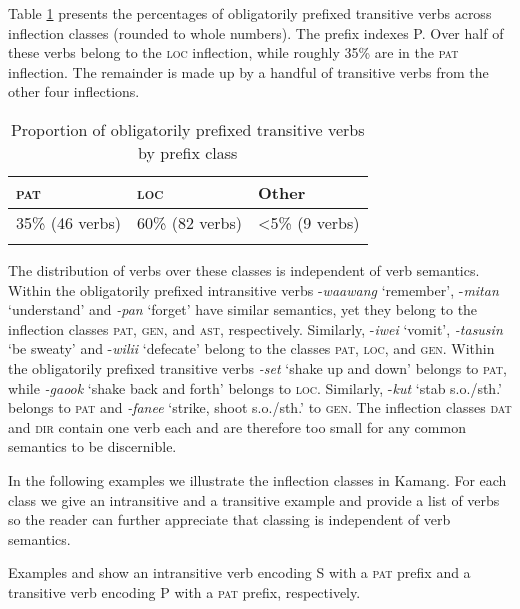Table \ref{tab:10:110} presents the percentages of obligatorily prefixed transitive verbs across inflection classes (rounded to whole numbers). The prefix indexes P. Over half of these verbs belong to the \textsc{loc} inflection, while roughly 35\% are in the \textsc{pat} inflection. The remainder is made up by a handful of transitive verbs from the other four inflections.

\begin{table}[htb]

\caption{Proportion of obligatorily prefixed transitive verbs by prefix class}
\label{tab:10:110}
\begin{tabularx}{\textwidth}{XXX}
\lsptoprule

\textsc{pat} & \textsc{loc} & Other\\
\midrule
35\% (46 verbs) & 60\% (82 verbs) & {\textless}5\% (9 verbs)\\
\lspbottomrule
\end{tabularx}
\end{table}


The distribution of verbs over these classes is independent of verb semantics. Within the obligatorily prefixed intransitive verbs {}-\textit{waawang} `remember', -\textit{mitan} `understand' and \textit{{}-pan} `forget' have similar semantics, yet they belong to the inflection classes \textsc{pat}, \textsc{gen}, and \textsc{ast}, respectively. Similarly, {}-\textit{iwei} `vomit', \textit{{}-tasusin} `be sweaty' and -\textit{wilii} `defecate' belong to the classes \textsc{pat,} \textsc{loc}, and \textsc{gen}. Within the obligatorily prefixed transitive verbs \textit{-set} `shake up and down' belongs to \textsc{pat}, while \textit{-gaook} `shake back and forth' belongs to \textsc{loc}. Similarly, -\textit{kut} `stab s.o./sth.' belongs to \textsc{pat} and \textit{{}-fanee} `strike, shoot s.o./sth.' to \textsc{gen}. The inflection classes \textsc{dat} and \textsc{dir} contain one verb each and are therefore too small for any common semantics to be discernible.

In the following examples we illustrate the inflection classes in Kamang. For each class we give an intransitive and a transitive example and provide a list of verbs so the reader can further appreciate that classing is independent of verb semantics.

Examples  and  show an intransitive verb encoding S with a \textsc{pat} prefix and a transitive verb encoding P with a \textsc{pat} prefix, respectively.


